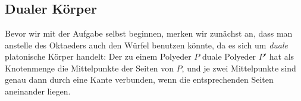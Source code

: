 \section{}





\subsection*{Dualer Körper}

Bevor wir mit der Aufgabe selbst beginnen, merken wir zunächst an, dass man anstelle des Oktaeders auch den Würfel benutzen könnte, da es sich um \emph{duale} platonische Körper handelt:
Der zu einem Polyeder $P$ duale Polyeder $P'$ hat als Knotenmenge die Mittelpunkte der Seiten von $P$, und je zwei Mittelpunkte sind genau dann durch eine Kante verbunden, wenn die entsprechenden Seiten aneinander liegen.
